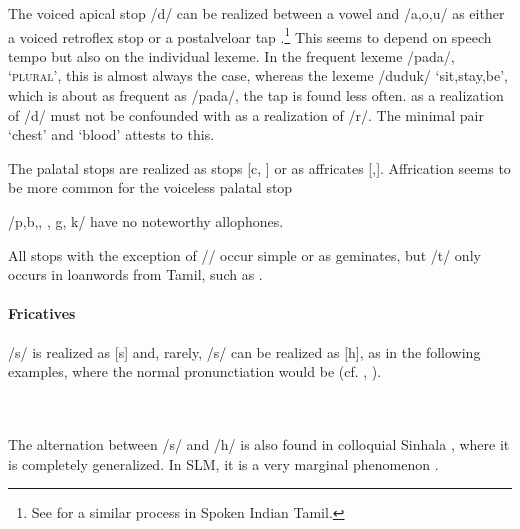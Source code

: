 The voiced apical stop /d/ can be realized between a vowel and /a,o,u/ as either a voiced retroflex stop \phonet{\dz} or a  postalveloar tap .\footnote{See \citet[14]{Schiffman1999} for a similar process in Spoken Indian Tamil.} This seems to depend on speech tempo but also on the individual lexeme. In the frequent lexeme /pada/, `\textsc{plural}', this is almost always the case, whereas the lexeme /duduk/ `sit,stay,be', which is about as frequent as /pada/, the tap is found less often.  as a  realization of /d/ must not be confounded with  as a realization of /r/. The minimal pair  `chest' and  `blood' attests to this.

The palatal stops are    realized as stops [c, \J{}] or as affricates [\textcttctclig,\textctdctzlig]. Affrication seems to be more common for the voiceless palatal stop

/p,b,\dentt, \dentd, g, k/ have no noteworthy allophones.

All stops with the exception of /\dentd/ occur simple or as geminates, but /t/ only occurs in loanwords from Tamil, such as .


\paragraph{Fricatives}
/s/ is realized as [s] and,  rarely, /s/ can be realized as [h], as in the following examples, where the normal pronunctiation would be  (cf. \citet[65]{Bichsel}, \citet{SmithEtAl2004}).

\\ 

 \\
The alternation between /s/ and /h/ is also found in colloquial Sinhala \citep[18]{Matzel1983}, where it is completely generalized. In SLM, it is a very marginal phenomenon \citep[cf.][65]{Bichsel}.
 
